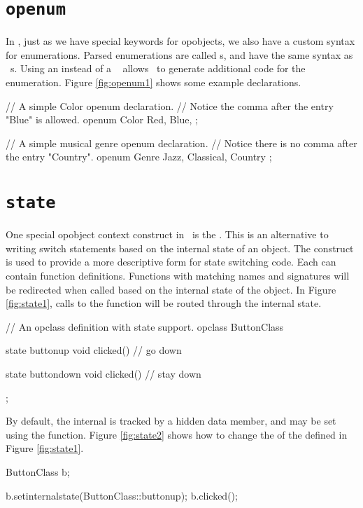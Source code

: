 \section{{\tt openum}}

In \opCPP, just as we have special keywords for opobjects, we also have a custom syntax for enumerations.  Parsed enumerations are called s, and have the same syntax as \cpp\ s.  Using an  instead of a \cpp\  allows \opCPP\ to generate additional code for the enumeration.  Figure \ref{fig:openum1} shows some example  declarations.

\begin{opcpp}[label={fig:openum1},caption={Some simple \opcppK{openum} declarations in \opCPP.}]
// A simple Color openum declaration.
// Notice the comma after the entry "Blue" is allowed.
openum Color
{
	Red,
	Blue,
};

// A simple musical genre openum declaration.
// Notice there is no comma after the entry "Country".
openum Genre
{
	Jazz,
	Classical,
	Country
};
\end{opcpp}

\section{{\tt state}}

One special opobject context construct in \opCPP\ is the .  This is an alternative to writing switch statements based on the internal state of an object.  The  construct is used to provide a more descriptive form for state switching code.  Each  can contain function definitions.  Functions with matching names and signatures will be redirected when called based on the internal state of the object.  In Figure \ref{fig:state1}, calls to the function  will be routed through the internal state.

\begin{opcpp}[label={fig:state1},caption={An example of using the \opcppK{state} construct in \opCPP.}]
// An opclass definition with state support.
opclass ButtonClass
{
	state buttonup
	{
		void clicked()
		{
			// go down
		}	
	}
	
	state buttondown
	{
		void clicked()
		{
			// stay down
		}
	}
};
\end{opcpp}

By default, the internal  is tracked by a hidden data member, and may be set using the  function.  Figure \ref{fig:state2} shows how to change the  of the  defined in Figure \ref{fig:state1}.

\begin{opcpp}[label={fig:state2},caption={Changing the internal \opcppK{state} of an instance of \opcppK{ButtonClass} defined in Figure \ref{fig:state1}.}]
ButtonClass b;

b.setinternalstate(ButtonClass::buttonup);
b.clicked();
\end{opcpp}




